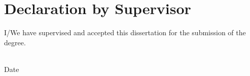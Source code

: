 \chapter*{Declaration by Supervisor}

\begin{flushleft}
	I/We have supervised and accepted this dissertation for the submission of the degree. \\

	\vspace{15mm}
	
	{\makebox[6.5cm]{\dotfill}} \hfill {\makebox[5cm]{\dotfill}}  \\ 
	\supervisorA \hfill Date \\
	
	
	
	
\end{flushleft}
